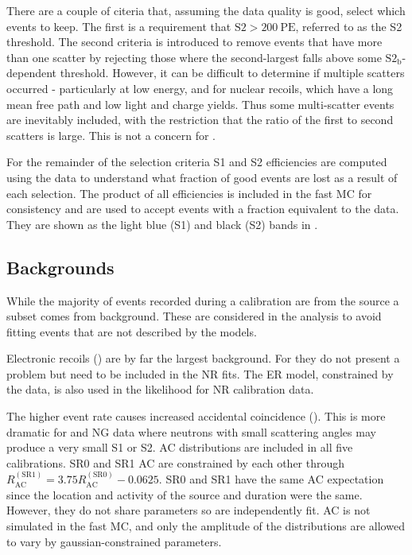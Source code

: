 There are a couple of citeria that, assuming the data quality is good, select which events to keep.  The first is a requirement that
$\mathrm{S2} > 200\ \mathrm{PE}$, referred to as the S2 threshold.  The second criteria is introduced to remove events that have more than
one scatter by rejecting those where the second-largest \stwob falls above some $\mathrm{S2_b}$-dependent threshold.  However, it can be
difficult to determine if multiple scatters occurred - particularly at low energy, and for nuclear
recoils, which have a long mean free path and low light and charge yields.  Thus some multi-scatter events are inevitably included,
with the restriction that the ratio of the first to second scatters is large.  This is not a concern for .

For the remainder of the selection criteria S1 and S2 efficiencies are computed using the data to understand what fraction of good events
are lost as a result of each selection.  The product of all efficiencies is included in the fast MC for consistency and are used to
accept events with a fraction equivalent to the data.  They are shown as the light blue (S1) and
black (S2) bands in .



\subsection{Backgrounds}
\label{subsec:er_nr_calibrations_parameter_determ_additional_components}
While the majority of events recorded during a calibration are from the source a subset comes
from background.  These are considered in the analysis to avoid fitting events that are not described by the models.

Electronic recoils () are by far the largest background.  For 
they do not present a problem but need to be included in the NR fits.  The ER model, constrained by the  data, is also used
in the likelihood for NR calibration data.

The higher event rate causes increased accidental coincidence ().  This is more dramatic
for \ambe and NG data where neutrons with small scattering angles may produce a very small S1 or S2.  AC distributions are included
in all five calibrations.  SR0 and SR1  AC are constrained by each other through
$R_{\mathrm{AC}}^{\mathrm{(SR1)}} = 3.75 R_{\mathrm{AC}}^{\mathrm{(SR0)}} - 0.0625$.  SR0 and SR1 \ambe
have the same AC expectation since the location and activity of the source and duration were the same.  However, they do not share
parameters so are independently fit.  AC is not
simulated in the fast MC, and only the amplitude of the distributions are allowed to vary by gaussian-constrained parameters.


